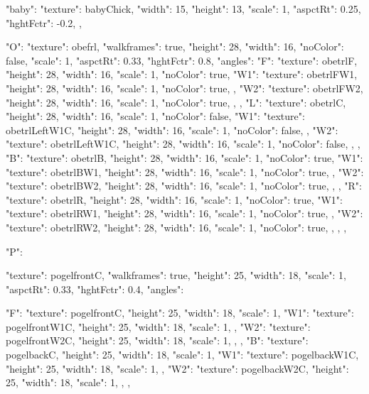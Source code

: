 {  "baby": {
    "texture": babyChick,
    "width": 15,
    "height": 13,
    "scale": 1,
    "aspctRt": 0.25,
    "hghtFctr": -0.2,
  },

  "O": {
    "texture": obefrl,
    "walkframes": true,
    "height": 28,
    "width": 16,
    "noColor": false,
    "scale": 1,
    "aspctRt": 0.33,
    "hghtFctr": 0.8,
    "angles":{
      "F": {
        "texture": obetrlF,
        "height": 28,
        "width": 16,
        "scale": 1,
        "noColor": true,
        "W1": {
          "texture": obetrlFW1,
          "height": 28,
          "width": 16,
          "scale": 1,
          "noColor": true,
        },
        "W2": {
          "texture": obetrlFW2,
          "height": 28,
          "width": 16,
          "scale": 1,
          "noColor": true,
        },
      },
      "L": {
        "texture": obetrlC,
        "height": 28,
        "width": 16,
        "scale": 1,
        "noColor": false,
        "W1": {
          "texture": obetrlLeftW1C,
          "height": 28,
          "width": 16,
          "scale": 1,
          "noColor": false,
        },
        "W2": {
          "texture": obetrlLeftW1C,
          "height": 28,
          "width": 16,
          "scale": 1,
          "noColor": false,
        },
      },
      "B": {
        "texture": obetrlB,
        "height": 28,
        "width": 16,
        "scale": 1,
        "noColor": true,
        "W1": {
          "texture": obetrlBW1,
          "height": 28,
          "width": 16,
          "scale": 1,
          "noColor": true,
        },
        "W2": {
          "texture": obetrlBW2,
          "height": 28,
          "width": 16,
          "scale": 1,
          "noColor": true,
        },
      },
      "R": {
        "texture": obetrlR,
        "height": 28,
        "width": 16,
        "scale": 1,
        "noColor": true,
        "W1": {
          "texture": obetrlRW1,
          "height": 28,
          "width": 16,
          "scale": 1,
          "noColor": true,
        },
        "W2": {
          "texture": obetrlRW2,
          "height": 28,
          "width": 16,
          "scale": 1,
          "noColor": true,
        },
      },
    }
  },

  "P": {
    "texture": pogelfrontC,
    "walkframes": true,
    "height": 25,
    "width": 18,
    "scale": 1,
    "aspctRt": 0.33,
    "hghtFctr": 0.4,
    "angles":{
      "F": {
        "texture": pogelfrontC,
        "height": 25,
        "width": 18,
        "scale": 1,
        "W1": {
          "texture": pogelfrontW1C,
          "height": 25,
          "width": 18,
          "scale": 1,
        },
        "W2": {
          "texture": pogelfrontW2C,
          "height": 25,
          "width": 18,
          "scale": 1,
        },
      },
      "B": {
        "texture": pogelbackC,
        "height": 25,
        "width": 18,
        "scale": 1,
        "W1": {
          "texture": pogelbackW1C,
          "height": 25,
          "width": 18,
          "scale": 1,
        },
        "W2": {
          "texture": pogelbackW2C,
          "height": 25,
          "width": 18,
          "scale": 1,
        },
      },

}}}
